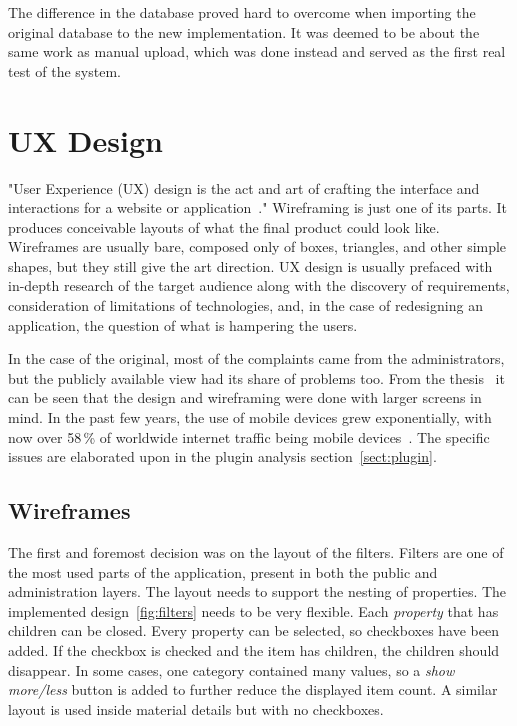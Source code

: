 \documentclass[
  digital,     %
  oneside,     %
  nosansbold,  %
  colorbold, %
  lof,         %
  lot,         %
]{fithesis4}
\begin{document}
The difference in the database proved hard to overcome when importing the original database to the new implementation. It was deemed to be about the same work as manual upload, which was done instead and served as the first real test of the system.

\section{UX Design}

"User Experience (UX) design is the act and art of crafting the interface and interactions for a website or application~\cite{hamm14}." Wireframing is just one of its parts. It produces conceivable layouts of what the final product could look like. Wireframes are usually bare, composed only of boxes, triangles, and other simple shapes, but they still give the art direction. UX design is usually prefaced with in-depth research of the target audience along with the discovery of requirements, consideration of limitations of technologies, and, in the case of redesigning an application, the question of what is hampering the users.

In the case of the original, most of the complaints came from the administrators, but the publicly available view had its share of problems too. From the thesis~\cite{lang18} it can be seen that the design and wireframing were done with larger screens in mind. In the past few years, the use of mobile devices grew exponentially, with now over 58\,\% of worldwide internet traffic being mobile devices~\cite{mobile_usage}. The specific issues are elaborated upon in the plugin analysis section~\ref{sect:plugin}.

\subsection{Wireframes}

The first and foremost decision was on the layout of the filters. Filters are one of the most used parts of the application, present in both the public and administration layers. The layout needs to support the nesting of properties. The implemented design~\ref{fig:filters} needs to be very flexible. Each \textit{property} that has children can be closed. Every property can be selected, so checkboxes have been added. If the checkbox is checked and the item has children, the children should disappear. In some cases, one category contained many values, so a \textit{show more/less} button is added to further reduce the displayed item count. A similar layout is used inside material details but with no checkboxes.
\end{document}
